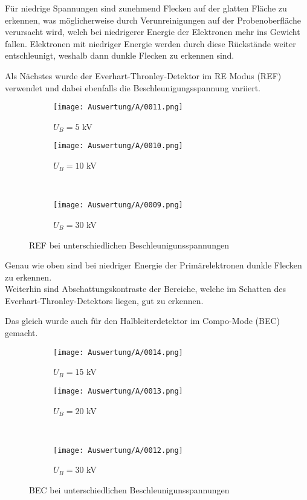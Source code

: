 Für niedrige Spannungen sind zunehmend Flecken auf der glatten Fläche zu erkennen, was möglicherweise durch Verunreinigungen auf der Probenoberfläche verursacht wird, welch bei niedrigerer Energie der Elektronen mehr ins Gewicht fallen. Elektronen mit niedriger Energie werden durch diese Rückstände weiter entschleunigt, weshalb dann dunkle Flecken zu erkennen sind.

\newpage
Als Nächstes wurde der Everhart-Thronley-Detektor im RE Modus (REF) verwendet und dabei ebenfalls die Beschleunigungsspannung variiert.
\begin{figure}[h]
    \centering
    
    \begin{subfigure}[b]{0.45\textwidth}
        \centering
        \texttt{[image: Auswertung/A/0011.png]}
        \caption{$U_B = 5$ kV}
    \end{subfigure}
    \hfill
    \begin{subfigure}[b]{0.45\textwidth}
        \centering
        \texttt{[image: Auswertung/A/0010.png]}
        \caption{$U_B = 10$ kV}
    \end{subfigure}
    \\
    \begin{subfigure}[b]{0.45\textwidth}
        \centering
        \texttt{[image: Auswertung/A/0009.png]}
        \caption{$U_B = 30$ kV}
    \end{subfigure}
    \caption{REF bei unterschiedlichen Beschleunigunsspannungen}
\end{figure}

Genau wie oben sind bei niedriger Energie der Primärelektronen dunkle Flecken zu erkennen.\\
Weiterhin sind Abschattungskontraste der Bereiche, welche im Schatten des Everhart-Thronley-Detektors liegen, gut zu erkennen.

\newpage
Das gleich wurde auch für den Halbleiterdetektor im Compo-Mode (BEC) gemacht.
\begin{figure}[h]
    \centering
    
    \begin{subfigure}[b]{0.45\textwidth}
        \centering
        \texttt{[image: Auswertung/A/0014.png]}
        \caption{$U_B = 15$ kV}
    \end{subfigure}
    \hfill
    \begin{subfigure}[b]{0.45\textwidth}
        \centering
        \texttt{[image: Auswertung/A/0013.png]}
        \caption{$U_B = 20$ kV}
    \end{subfigure}
    \\
    \begin{subfigure}[b]{0.45\textwidth}
        \centering
        \texttt{[image: Auswertung/A/0012.png]}
        \caption{$U_B = 30$ kV}
    \end{subfigure}
    \caption{BEC bei unterschiedlichen Beschleunigunsspannungen}
\end{figure}

